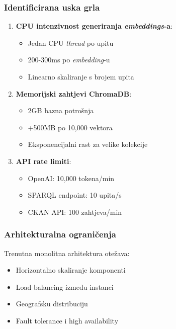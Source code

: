 \subsubsection{Identificirana uska grla}

\begin{enumerate}
    \item \textbf{CPU intenzivnost generiranja \textit{embeddings}-a}:
    \begin{itemize}
        \item Jedan CPU \textit{thread} po upitu
        \item 200-300ms po \textit{embedding}-u
        \item Linearno skaliranje s brojem upita
    \end{itemize}
    
    \item \textbf{Memorijski zahtjevi ChromaDB}:
    \begin{itemize}
        \item 2GB bazna potrošnja
        \item +500MB po 10,000 vektora
        \item Eksponencijalni rast za velike kolekcije
    \end{itemize}
    
    \item \textbf{API rate limiti}:
    \begin{itemize}
        \item OpenAI: 10,000 tokena/min
        \item SPARQL endpoint: 10 upita/s
        \item CKAN API: 100 zahtjeva/min
    \end{itemize}
\end{enumerate}

\subsubsection{Arhitekturalna ograničenja}

Trenutna monolitna arhitektura otežava:

\begin{itemize}
    \item Horizontalno skaliranje komponenti
    \item Load balancing između instanci
    \item Geografsku distribuciju
    \item Fault tolerance i high availability
\end{itemize}

